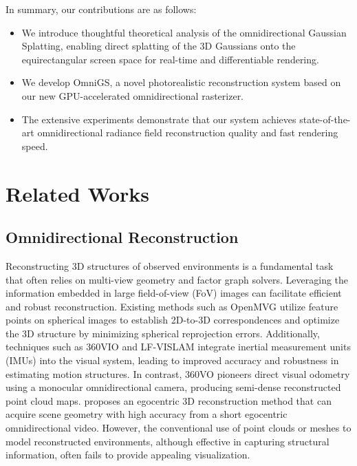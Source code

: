 \documentclass[10pt,twocolumn,letterpaper]{article}
\begin{document}
In summary, our contributions are as follows:
\begin{itemize}
    \item We introduce thoughtful theoretical analysis of the omnidirectional Gaussian Splatting, enabling direct splatting of the 3D Gaussians onto the equirectangular screen space for real-time and differentiable rendering.
    \item We develop OmniGS, a novel photorealistic reconstruction system based on our new GPU-accelerated omnidirectional rasterizer. %
    \item The extensive experiments demonstrate that our system achieves state-of-the-art omnidirectional radiance field reconstruction quality and fast rendering speed. 
\end{itemize}

\section{Related Works}
\label{sec:related-works}
\subsection{Omnidirectional Reconstruction}
Reconstructing 3D structures of observed environments is a fundamental task that often relies on multi-view geometry and factor graph solvers. Leveraging the information embedded in large field-of-view (FoV) images can facilitate efficient and robust reconstruction. Existing methods such as OpenMVG \cite{sparse:openmvg} utilize feature points on spherical images to establish 2D-to-3D correspondences and optimize the 3D structure by minimizing spherical reprojection errors. 
Additionally, techniques such as 360VIO \cite{sparse:360vio} and LF-VISLAM \cite{sparse:lfvislam} integrate inertial measurement units (IMUs) into the visual system, leading to improved accuracy and robustness in estimating motion structures. In contrast, 360VO \cite{sparse:360vo} pioneers direct visual odometry using a monocular omnidirectional camera, producing semi-dense reconstructed point cloud maps. \cite{Egocentric:SIG:2022} proposes an egocentric 3D reconstruction method that can acquire scene geometry with high accuracy from a short egocentric omnidirectional video. 
However, the conventional use of point clouds or meshes to model reconstructed environments, although effective in capturing structural information, often fails to provide appealing visualization.
\end{document}

